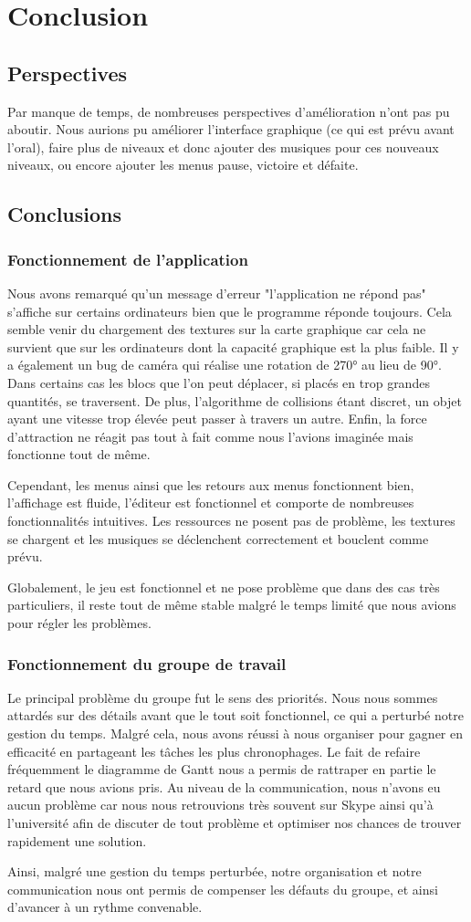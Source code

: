 \chapter{Conclusion}
	\section{Perspectives}
		Par manque de temps, de nombreuses perspectives d'amélioration n'ont pas pu aboutir. Nous aurions pu améliorer l'interface graphique (ce qui est prévu avant l'oral), faire plus de niveaux et donc ajouter des musiques pour ces nouveaux niveaux, ou encore ajouter les menus pause, victoire et défaite.
	\section{Conclusions}
		\subsection{Fonctionnement de l'application}
			Nous avons remarqué qu'un message d'erreur "l'application ne répond pas" s'affiche sur certains ordinateurs bien que le programme réponde toujours. Cela semble venir du chargement des textures sur la carte graphique car cela ne survient que sur les ordinateurs dont la capacité graphique est la plus faible. Il y a également un bug de caméra qui réalise une rotation de 270° au lieu de 90°. Dans certains cas les blocs que l'on peut déplacer, si placés en trop grandes quantités, se traversent. De plus, l'algorithme de collisions étant discret, un objet ayant une vitesse trop élevée peut passer à travers un autre. Enfin, la force d'attraction ne réagit pas tout à fait comme nous l'avions imaginée mais fonctionne tout de même.

			Cependant, les menus ainsi que les retours aux menus fonctionnent bien, l'affichage est fluide, l'éditeur est fonctionnel et comporte de nombreuses fonctionnalités intuitives. Les ressources ne posent pas de problème, les textures se chargent et les musiques se déclenchent correctement et bouclent comme prévu.

			Globalement, le jeu est fonctionnel et ne pose problème que dans des cas très particuliers, il reste tout de même stable malgré le temps limité que nous avions pour régler les problèmes.

		\subsection{Fonctionnement du groupe de travail}
			Le principal problème du groupe fut le sens des priorités. Nous nous sommes attardés sur des détails avant que le tout soit fonctionnel, ce qui a perturbé notre gestion du temps. Malgré cela, nous avons réussi à nous organiser pour gagner en efficacité en partageant les tâches les plus chronophages. Le fait de refaire fréquemment le diagramme de Gantt nous a permis de rattraper en partie le retard que nous avions pris. Au niveau de la communication, nous n'avons eu aucun problème car nous nous retrouvions très souvent sur Skype ainsi qu'à l'université afin de discuter de tout problème et optimiser nos chances de trouver rapidement une solution.

			Ainsi, malgré une gestion du temps perturbée, notre organisation et notre communication nous ont permis de compenser les défauts du groupe, et ainsi d'avancer à un rythme convenable. 
